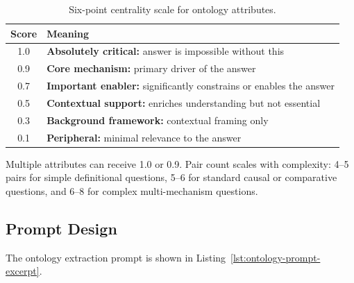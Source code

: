 \begin{table}[htbp]
\centering
\caption{Six-point centrality scale for ontology attributes.}
\label{tab:centrality-scale}
\begin{tabular}{cl}
\toprule
Score & Meaning \\
\midrule
1.0 & \textbf{Absolutely critical:} answer is impossible without this \\
0.9 & \textbf{Core mechanism:} primary driver of the answer \\
0.7 & \textbf{Important enabler:} significantly constrains or enables the answer \\
0.5 & \textbf{Contextual support:} enriches understanding but not essential \\
0.3 & \textbf{Background framework:} contextual framing only \\
0.1 & \textbf{Peripheral:} minimal relevance to the answer \\
\bottomrule
\end{tabular}
\end{table}

Multiple attributes can receive 1.0 or 0.9. Pair count scales with complexity: 4--5 pairs for simple definitional questions, 5--6 for standard causal or comparative questions, and 6--8 for complex multi-mechanism questions.

\subsection{Prompt Design}
\label{subsec:ontology-prompt-design}

The ontology extraction prompt is shown in Listing~\ref{lst:ontology-prompt-excerpt}.


